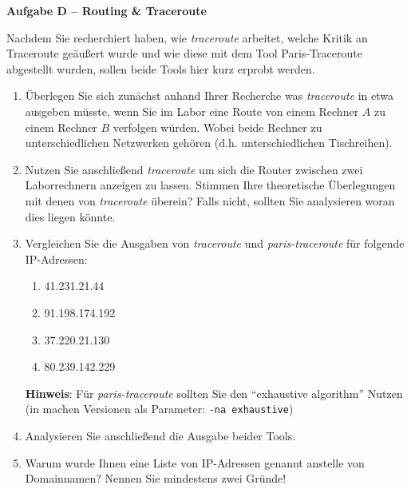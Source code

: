 \documentclass[paper=a4,fontsize=11pt]{scrartcl}%
\begin{document}
\begin{center}\Large{\textbf{Aufgabe D -- Routing \& Traceroute}}\end{center}\vskip0.25in
Nachdem Sie recherchiert haben, wie \emph{traceroute} arbeitet, welche Kritik an Traceroute geäußert wurde und wie diese mit dem Tool Paris-Traceroute abgestellt wurden, sollen beide Tools hier kurz erprobt werden.
\begin{enumerate}
	\item Überlegen Sie sich zunächst anhand Ihrer Recherche was \emph{traceroute} in etwa ausgeben müsste, wenn Sie im Labor eine Route von einem Rechner $A$ zu einem Rechner $B$ verfolgen würden. Wobei beide Rechner zu unterschiedlichen Netzwerken gehören (d.h. unterschiedlichen Tischreihen). 
	\item Nutzen Sie anschließend \emph{traceroute} um sich die Router zwischen zwei Laborrechnern anzeigen zu lassen. Stimmen Ihre theoretische Überlegungen mit denen von \emph{traceroute} überein? Falls nicht, sollten Sie analysieren woran dies liegen könnte.
	\item Vergleichen Sie die Ausgaben von \emph{traceroute} und \emph{paris-traceroute} für folgende IP-Adressen:
	\begin{enumerate}
		\item 41.231.21.44
		\item 91.198.174.192
		\item 37.220.21.130
		\item 80.239.142.229
	\end{enumerate}
	\textbf{Hinweis}: Für \emph{paris-traceroute} sollten Sie den \enquote{exhaustive algorithm} Nutzen (in machen Versionen als Parameter: \texttt{-na exhaustive})
	\item Analysieren Sie anschließend die Ausgabe beider Tools.
	\item Warum wurde Ihnen eine Liste von IP-Adressen genannt anstelle von Domainnamen? Nennen Sie mindestens zwei Gründe!
\end{enumerate}
\end{document}

